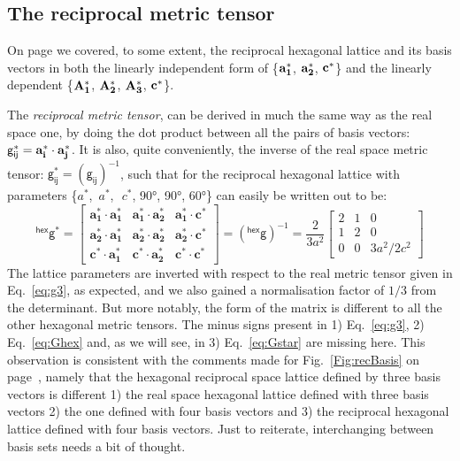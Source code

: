 \subsection{The reciprocal metric tensor}

On page \pageref{sec:recHex} we covered, to some extent, the reciprocal hexagonal lattice and its basis vectors in both the linearly independent form of \{$\vb{a^*_1}$, $\vb{a^*_2}$, $\vb{c^*}$\} and the linearly dependent \{$\vb{A^*_1}$, $\vb{A^*_2}$, $\vb{A^*_3}$, $\vb{c^*}$\}. 

The \textit{reciprocal metric tensor}, can be derived in much the same way as the real space one, by doing the dot product between all the pairs of basis vectors: $\mathsf{g_{ij}^*}=\vb{a_i^*}\cdot\vb{a_j^*}$. It is also, quite conveniently, the inverse of the real space metric tensor: $\mathsf{g_{ij}^*}=\mathsf{(g_{ij})}^{-1}$, such that for the reciprocal hexagonal lattice with parameters \{$a^*$, $\,a^*$,\, $\,c^*$, 90\si{\degree}, 90\si{\degree}, 60\si{\degree}\} can easily be written out to be:
\begin{equation}
\label{eq:gstar}
     \mathsf{^{hex}g^*}  =  \begin{bmatrix}
    \mathbf{a_1^*} \cdot \mathbf{a_1^*}       & \mathbf{a_1^*} \cdot \mathbf{a_2^*} & \mathbf{a_1^*} \cdot \mathbf{c^*} \\
    \mathbf{a_2^*} \cdot \mathbf{a_1^*}       & \mathbf{a_2^*} \cdot \mathbf{a_2^*} & \mathbf{a_2^*} \cdot \mathbf{c^*} \\
    \mathbf{c^*} \cdot \mathbf{a_1^*}       & \mathbf{c^*} \cdot \mathbf{a_2^*} & \mathbf{c^*} \cdot \mathbf{c^*}
\end{bmatrix}= \mathsf{(^{hex}g)}^{-1} =
    \frac{2}{3a^2}\begin{bmatrix}
   2       & 1           & 0 \\[6pt]
   1       & 2           & 0 \\[6pt]
   0       & 0           & 3a^2/2c^2
\end{bmatrix} 
\end{equation}
The lattice parameters are inverted with respect to the real metric tensor given in Eq.~\ref{eq:g3}, as expected, and we also gained a normalisation factor of $1/3$ from the determinant. But more notably, the form of the matrix is different to all the other hexagonal metric tensors. The minus signs present in 1) Eq.~\ref{eq:g3}, 2) Eq.~\ref{eq:Ghex} and, as we will see, in 3) Eq.~\ref{eq:Gstar} are missing here. This observation is consistent with the comments made for Fig.~\ref{Fig:recBasis} on page~\pageref{Fig:recBasis}, namely that the hexagonal reciprocal space lattice defined by three basis vectors is different 1) the real space  hexagonal lattice defined with three basis vectors 2) the one defined with four basis vectors and 3) the reciprocal hexagonal lattice defined with four basis vectors. Just to reiterate, interchanging between basis sets needs a bit of thought.

